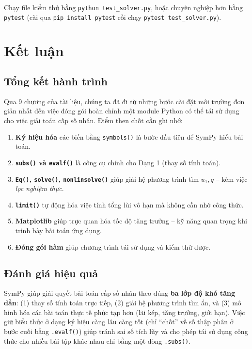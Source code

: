 \documentclass[12pt,a4paper]{report}
\begin{document}
\begin{tipbox}
Chạy file kiểm thử bằng \texttt{python test\_solver.py}, hoặc chuyên
nghiệp hơn bằng \texttt{pytest} (cài qua \texttt{pip install pytest}
rồi chạy \texttt{pytest test\_solver.py}).
\end{tipbox}

\newpage

\chapter*{Kết luận}

\section*{Tổng kết hành trình}

Qua 9 chương của tài liệu, chúng ta đã đi từ những bước cài đặt môi
trường đơn giản nhất đến việc đóng gói hoàn chỉnh một module Python có
thể tái sử dụng cho việc giải toán cấp số nhân. Điểm then chốt cần ghi
nhớ:

\begin{enumerate}
  \item \textbf{Ký hiệu hóa} các biến bằng \texttt{symbols()} là bước
  đầu tiên để SymPy hiểu bài toán.
  \item \textbf{\texttt{subs()} và \texttt{evalf()}} là công cụ chính
  cho Dạng 1 (thay số tính toán).
  \item \textbf{\texttt{Eq()}, \texttt{solve()}, \texttt{nonlinsolve()}}
  giúp giải hệ phương trình tìm $u_1, q$ -- kèm việc \emph{lọc nghiệm
  thực}.
  \item \textbf{\texttt{limit()}} tự động hóa việc tính tổng lùi vô
  hạn mà không cần nhớ công thức.
  \item \textbf{Matplotlib} giúp trực quan hóa tốc độ tăng trưởng --
  kỹ năng quan trọng khi trình bày bài toán ứng dụng.
  \item \textbf{Đóng gói hàm} giúp chương trình tái sử dụng và kiểm
  thử được.
\end{enumerate}

\section*{Đánh giá hiệu quả}

SymPy giúp giải quyết bài toán cấp số nhân theo đúng \textbf{ba lớp độ
khó tăng dần}: (1) thay số tính toán trực tiếp, (2) giải hệ phương trình
tìm ẩn, và (3) mô hình hóa các bài toán thực tế phức tạp hơn (lãi kép,
tăng trưởng, giới hạn). Việc giữ biểu thức ở dạng ký hiệu càng lâu càng
tốt (chỉ ``chốt'' về số thập phân ở bước cuối bằng \texttt{.evalf()})
giúp tránh sai số tích lũy và cho phép tái sử dụng công thức cho nhiều
bài tập khác nhau chỉ bằng một dòng \texttt{.subs()}.
\end{document}
